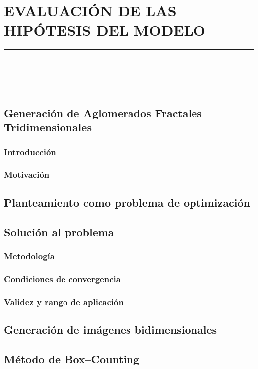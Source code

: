 \chapter{EVALUACIÓN DE LAS HIPÓTESIS DEL MODELO} \label{cap:EvaluacionHipotesisModelo}
\vspace{0.2cm}
\noindent\rule{\linewidth}{1.5pt}\\
\startcontents[chapters]
\vspace{0.2cm}
\noindent\rule{\linewidth}{1.3pt}\\
\newpage

\section{Generación de Aglomerados Fractales Tridimensionales}\label{sec:GeneracionAglomeradosFractales3D}
\subsection{Introducción}
\subsection{Motivación}
\section{Planteamiento como problema de optimización}\label{sec:PlanteamientoProblemaOptim}
\section{Solución al problema}\label{sec:SolucionProblema}
\subsection{Metodología}
\subsection{Condiciones de convergencia}
\subsection{Validez y rango de aplicación}
\section{Generación de imágenes bidimensionales}\label{sec:GeneracionImagenes2D}
\section{Método de Box--Counting}\label{sec:MetodoBoxCounting}
